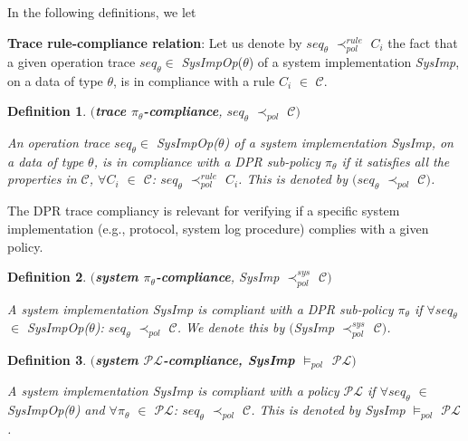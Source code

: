 \documentclass[a4paper]{article}
\newtheorem{ttd}{Definition}
\begin{document}
In the following definitions, we let 

\begin{center}
\noindent{}
\end{center} 

\noindent \textbf{Trace rule-compliance relation}: Let us denote by $\textit{seq}_{\theta}$ $\prec^{rule}_{pol}$ $C_i$ the fact that a given operation trace $\textit{seq}_{\theta}$$\in$ \textit{SysImpOp}($\theta$) of a system implementation \textit{SysImp}, on a data of type $\theta$, is in compliance with a rule $C_i$ $\in$ $\mathcal{C}$.  


\begin{ttd}$($\textbf{trace $\pi_{\theta}$-compliance}, $\textit{seq}_{\theta}$ $\prec_{pol}$ $\mathcal{C}$$)$

\noindent An operation trace $\textit{seq}_{\theta}$$\in$ \textit{SysImpOp}($\theta$) of a system implementation \textit{SysImp}, on a data of type $\theta$, is in compliance with a DPR sub-policy $\pi_{\theta}$ if it satisfies all the properties in $\mathcal{C}$, $\forall$$C_i$ $\in$ $\mathcal{C}$: $\textit{seq}_{\theta}$ $\prec^{rule}_{pol}$ $C_i$.  This is denoted by $($$\textit{seq}_{\theta}$ $\prec_{pol}$ $\mathcal{C}$$)$.  
\end{ttd} 

 
The DPR trace compliancy is relevant for verifying if a specific system implementation (e.g., protocol, system log procedure) complies with a given policy. 

\begin{ttd}$($\textbf{system $\pi_{\theta}$-compliance}, \textit{SysImp} $\prec^{sys}_{pol}$ $\mathcal{C}$$)$

\noindent A system implementation \textit{SysImp} is compliant with a DPR sub-policy $\pi_{\theta}$ if $\forall$$\textit{seq}_{\theta}$ $\in$ \textit{SysImpOp}($\theta$): $\textit{seq}_{\theta}$ $\prec_{pol}$ $\mathcal{C}$.  We denote this by $($\textit{SysImp} $\prec^{sys}_{pol}$ $\mathcal{C}$$)$.   
\end{ttd} 


\begin{ttd}$($\textbf{system $\mathcal{P}$$\mathcal{L}$-compliance, \textit{SysImp} $\models_{pol}$ $\mathcal{P}$$\mathcal{L}$}$)$

\noindent A system implementation \textit{SysImp} is compliant with a policy $\mathcal{P}$$\mathcal{L}$ if $\forall$$\textit{seq}_{\theta}$ $\in$ \textit{SysImpOp}($\theta$) and $\forall$$\pi_{\theta}$ $\in$ $\mathcal{P}$$\mathcal{L}$: $\textit{seq}_{\theta}$ $\prec_{pol}$ $\mathcal{C}$. This is denoted by \textit{SysImp} $\models_{pol}$ $\mathcal{P}$$\mathcal{L}$.   
\end{ttd} 
\end{document}
